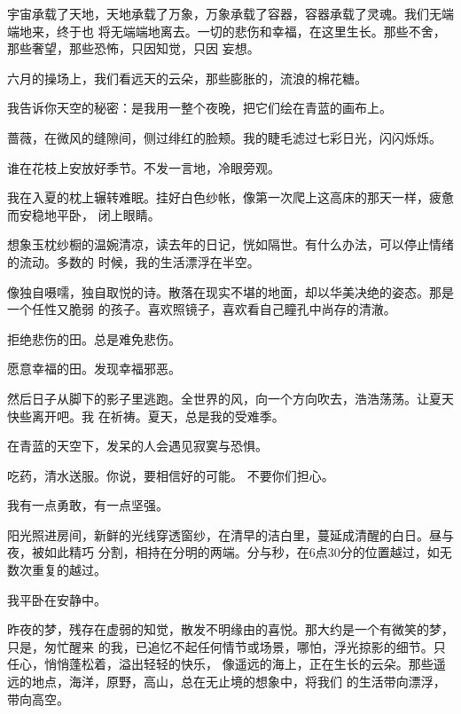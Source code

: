 \documentclass[12pt,a4paper]{article}
\def\blankrev{\vspace{1ex}}									%
\begin{document}
		宇宙承载了天地，天地承载了万象，万象承载了容器，容器承载了灵魂。我们无端端地来，终于也
	将无端端地离去。一切的悲伤和幸福，在这里生长。那些不舍，那些奢望，那些恐怖，只因知觉，只因
	妄想。

	\endwriting



		六月的操场上，我们看远天的云朵，那些膨胀的，流浪的棉花糖。\par
		我告诉你天空的秘密：是我用一整个夜晚，把它们绘在青蓝的画布上。\par
		蔷薇，在微风的缝隙间，侧过绯红的脸颊。我的睫毛滤过七彩日光，闪闪烁烁。

		谁在花枝上安放好季节。不发一言地，冷眼旁观。

		我在入夏的枕上辗转难眠。挂好白色纱帐，像第一次爬上这高床的那天一样，疲惫而安稳地平卧，
	闭上眼睛。

		想象玉枕纱橱的温婉清凉，读去年的日记，恍如隔世。有什么办法，可以停止情绪的流动。多数的
	时候，我的生活漂浮在半空。

		像独自嗫嚅，独自取悦的诗。散落在现实不堪的地面，却以华美决绝的姿态。那是一个任性又脆弱
	的孩子。喜欢照镜子，喜欢看自己瞳孔中尚存的清澈。

		\blankrev
		拒绝悲伤的田。总是难免悲伤。

		愿意幸福的田。发现幸福邪恶。
		\blankrev

		然后日子从脚下的影子里逃跑。全世界的风，向一个方向吹去，浩浩荡荡。让夏天快些离开吧。我
	在祈祷。夏天，总是我的受难季。

		在青蓝的天空下，发呆的人会遇见寂寞与恐惧。

		吃药，清水送服。你说，要相信好的可能。
		不要你们担心。

		我有一点勇敢，有一点坚强。

	\endwriting



		阳光照进房间，新鲜的光线穿透窗纱，在清早的洁白里，蔓延成清醒的白日。昼与夜，被如此精巧
	分割，相持在分明的两端。分与秒，在6点30分的位置越过，如无数次重复的越过。

		我平卧在安静中。

		昨夜的梦，残存在虚弱的知觉，散发不明缘由的喜悦。那大约是一个有微笑的梦，只是，匆忙醒来
	的我，已追忆不起任何情节或场景，哪怕，浮光掠影的细节。只任心，悄悄蓬松着，溢出轻轻的快乐，
	像遥远的海上，正在生长的云朵。那些遥远的地点，海洋，原野，高山，总在无止境的想象中，将我们
	的生活带向漂浮，带向高空。
\end{document}
